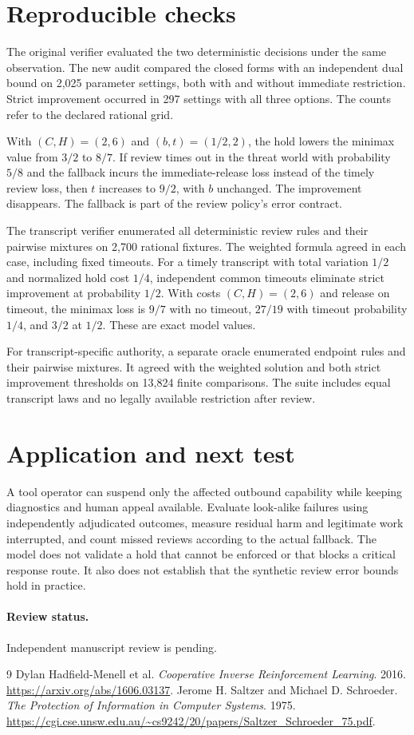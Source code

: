 \documentclass[11pt]{article}
\begin{document}
\section{Reproducible checks}
The original verifier evaluated the two deterministic decisions
under the same observation. The new audit compared the closed
forms with an independent dual bound on 2,025 parameter settings,
both with and without immediate restriction. Strict improvement
occurred in 297 settings with all three options. The counts
refer to the declared rational grid.

With $(C,H)=(2,6)$ and $(b,t)=(1/2,2)$, the hold lowers
the minimax value from $3/2$ to $8/7$. If review times out
in the threat world with probability $5/8$ and the fallback
incurs the immediate-release loss instead of the timely
review loss, then $t$ increases to $9/2$, with $b$ unchanged.
The improvement disappears. The fallback is part of the
review policy's error contract.

The transcript verifier enumerated all deterministic review
rules and their pairwise mixtures on 2,700 rational fixtures.
The weighted formula agreed in each case, including fixed
timeouts. For a timely transcript with total variation $1/2$
and normalized hold cost $1/4$, independent common timeouts
eliminate strict improvement at probability $1/2$. With costs
$(C,H)=(2,6)$ and release on timeout, the minimax loss is
$9/7$ with no timeout, $27/19$ with timeout probability
$1/4$, and $3/2$ at $1/2$. These are exact model values.

For transcript-specific authority, a separate oracle enumerated
endpoint rules and their pairwise mixtures. It agreed with the
weighted solution and both strict improvement thresholds on
13,824 finite comparisons. The suite includes equal transcript laws
and no legally available restriction after review.

\section{Application and next test}
A tool operator can suspend only the affected outbound capability
while keeping diagnostics and human appeal available. Evaluate
look-alike failures using independently adjudicated outcomes,
measure residual harm and legitimate work interrupted, and
count missed reviews according to the actual fallback. The
model does not validate a hold that cannot be enforced or that
blocks a critical response route. It also does not establish
that the synthetic review error bounds hold in practice.

\paragraph{Review status.} Independent manuscript review is pending.

\begin{thebibliography}{9}
 Dylan Hadfield-Menell et al. \emph{Cooperative Inverse Reinforcement Learning}. 2016. \url{https://arxiv.org/abs/1606.03137}.
 Jerome H. Saltzer and Michael D. Schroeder. \emph{The Protection of Information in Computer Systems}. 1975. \url{https://cgi.cse.unsw.edu.au/~cs9242/20/papers/Saltzer_Schroeder_75.pdf}.
\end{thebibliography}
\end{document}
